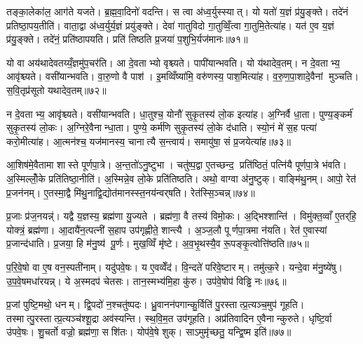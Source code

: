 तङ्का॒लेका॑ल॒ आग॑ते यजते। ब्र॒ह्म॒वा॒दिनो॑ वदन्ति। स त्वा अ॑ध्व॒र्युस्स्यात्। यो यतो॑ य॒ज्ञं प्र॑यु॒ङ्क्ते। तदे॑नं प्रतिष्ठा॒पय॒तीति॑। वाता॒द्वा अ॑ध्व॒र्युर्य॒ज्ञं प्रयु॑ङ्क्ते। देवा॑ गातुविदो गा॒तुव्विँ॒त्वा गा॒तुमि॒तेत्या॑ह। यत॑ ए॒व य॒ज्ञं प्र॑यु॒ङ्क्ते। तदे॑नं॒ प्रति॑ष्ठापयति। प्रति॑ तिष्ठति प्र॒जया॑ प॒शुभि॒र्यज॑मानः॥७१॥

यो वा अय॑थादेवतय्यँ॒ज्ञमु॑प॒चर॑ति। आ दे॒वताभ्यो वृश्च्यते। पापी॑यान्भवति। यो य॑थादेव॒तम्। न दे॒वताभ्य॒ आवृ॑श्च्यते। वसी॑यान्भवति। वा॒रु॒णो वै पाश॑। इ॒मव्विँष्या॑मि॒ वरु॑णस्य॒ पाश॒मित्या॑ह। व॒रु॒ण॒पा॒शादे॒वैनां मुञ्चति। स॒वि॒तृप्र॑सूतो यथादेव॒तम्॥७२॥

न दे॒वताभ्य॒ आवृ॑श्च्यते। वसी॑यान्भवति। धा॒तुश्च॒ योनौ॑ सुकृ॒तस्य॑ लो॒क इत्या॑ह। अ॒ग्निर्वै धा॒ता। पुण्य॒ङ्कर्म॑ सुकृ॒तस्य॑ लो॒कः। अ॒ग्निरे॒वैनान्धा॒ता। पुण्ये॒ कर्म॑णि सुकृ॒तस्य॑ लो॒के द॑धाति। स्यो॒नं मे॑ स॒ह पत्या॑ करो॒मीत्या॑ह। आ॒त्मन॑श्च॒ यज॑मानस्य॒ चानात्यै स॒न्त्वाय॑। समायु॑षा॒ सं प्र॒जयेत्या॑ह॥७३॥

आ॒शिष॑मे॒वैतामा शास्ते पूर्णपा॒त्रे। अ॒न्त॒तो॑ऽनु॒ष्टुभा। चतु॑ष्प॒द्वा ए॒तच्छन्द॒ प्रति॑ष्ठितं॒ पत्नि॑यै पूर्णपा॒त्रे भ॑वति। अ॒स्मिल्लोँ॒के प्रति॑तिष्ठा॒नीति॑। अ॒स्मिन्ने॒व लो॒के प्रति॑तिष्ठति। अथो॒ वाग्वा अ॑नु॒ष्टुक्। वाङ्मि॑थु॒नम्। आपो॒ रेत॑ प्र॒जन॑नम्। ए॒तस्मा॒द्वै मि॑थु॒नाद्वि॒द्योत॑मानस्स्त॒नय॑न्वर्‌षति। रेत॑स्सि॒ञ्चन्न्॥७४॥

प्र॒जाः प्र॑ज॒नयन्न्॑। यद्वै य॒ज्ञस्य॒ ब्रह्म॑णा यु॒ज्यते। ब्रह्म॑णा॒ वै तस्य॑ विमो॒कः। अ॒द्भिश्शान्ति॑। विमु॑क्त॒व्वाँ ए॒तर्‌हि॒ योक्त्रं॒ ब्रह्म॑णा। आ॒दायै॑न॒त्पत्नी॑ स॒हाप उप॑गृह्णीते॒ शान्त्यै। अ॒ञ्ज॒लौ पूर्णपा॒त्रमा न॑यति। रेत॑ ए॒वास्यां प्र॒जान्द॑धाति। प्र॒जया॒ हि म॑नु॒ष्य॑ पू॒र्णः। मुख॒व्विँ मृ॑ष्टे। अ॒व॒भृ॒थस्यै॒व रू॒पङ्कृ॒त्वोत्ति॑ष्ठति॥७५॥\anuvakamend[स॒वि॒तृप्र॑सूतो यथादेव॒तं प्र॒जयेत्या॑ह सि॒ञ्चन्मृ॑ष्ट॒ एक॑ञ्च]

प॒रि॒वे॒षो वा ए॒ष वन॒स्पती॑नाम्। यदु॑पवे॒षः। य ए॒वव्वेँद॑। वि॒न्दते॑ परिवे॒ष्टारम्। तमु॑त्क॒रे। यन्दे॒वा म॑नु॒ष्ये॑षु। उ॒प॒वे॒षमधा॑रयन्न्। ये अ॒स्मदप॑ चेतसः। तान॒स्मभ्य॑मि॒हा कु॑रु। उप॑वे॒षोप॑ विड्ढि नः॥७६॥

प्र॒जां पुष्टि॒मथो॒ धनम्। द्वि॒पदो॑ न॒श्चतु॑ष्पदः। ध्रु॒वानन॑पगान्कु॒र्विति॑ पु॒रस्तात्प्र॒त्यञ्च॒मुप॑ गूहति। तस्मात्पु॒रस्तात्प्र॒त्यञ्च॑श्शू॒द्रा अव॑स्यन्ति। स्थ॒वि॒म॒त उप॑गूहति। अप्र॑तिवादिन ए॒वैनान्कुरुते। धृष्टि॒र्वा उ॑पवे॒षः। शु॒चर्तो वज्रो॒ ब्रह्म॑णा॒ सशि॑तः। योप॑वे॒षे शुक्। साऽमुमृ॑च्छतु॒ यन्द्वि॒ष्म इति॑॥७७॥

